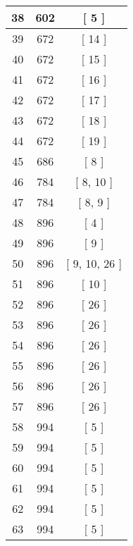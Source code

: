 \begin{center}
\begin{longtable}[H]{|| c c c ||}
\\\hline
38 & 602 & [ 5 ]
\\\hline
39 & 672 & [ 14 ]
\\\hline
40 & 672 & [ 15 ]
\\\hline
41 & 672 & [ 16 ]
\\\hline
42 & 672 & [ 17 ]
\\\hline
43 & 672 & [ 18 ]
\\\hline
44 & 672 & [ 19 ]
\\\hline
45 & 686 & [ 8 ]
\\\hline
46 & 784 & [ 8, 10 ]
\\\hline
47 & 784 & [ 8, 9 ]
\\\hline
48 & 896 & [ 4 ]
\\\hline
49 & 896 & [ 9 ]
\\\hline
50 & 896 & [ 9, 10, 26 ]
\\\hline
51 & 896 & [ 10 ]
\\\hline
52 & 896 & [ 26 ]
\\\hline
53 & 896 & [ 26 ]
\\\hline
54 & 896 & [ 26 ]
\\\hline
55 & 896 & [ 26 ]
\\\hline
56 & 896 & [ 26 ]
\\\hline
57 & 896 & [ 26 ]
\\\hline
58 & 994 & [ 5 ]
\\\hline
59 & 994 & [ 5 ]
\\\hline
60 & 994 & [ 5 ]
\\\hline
61 & 994 & [ 5 ]
\\\hline
62 & 994 & [ 5 ]
\\\hline
63 & 994 & [ 5 ]
\\\hline
\end{longtable}
\end{center}
